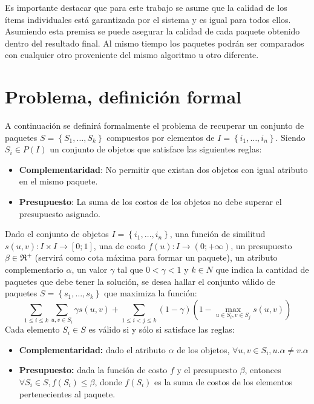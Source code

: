 Es importante destacar que para este trabajo se asume que la calidad de los ítems individuales está garantizada por el sistema y es igual para todos ellos. Asumiendo esta premisa se puede asegurar la calidad de cada paquete obtenido dentro del resultado final. Al mismo tiempo los paquetes podrán ser comparados con cualquier otro proveniente del mismo algoritmo u otro diferente.

\section{Problema, definición formal}\label{introduccion:problemaFormal}
A continuación se definirá formalmente el problema de recuperar un conjunto de paquetes $S = \left\{S_1, \ldots, S_k\right\}$ compuestos por elementos de $I=\left\{i_1,\ldots, i_n\right\}$. Siendo $S_i \in P(I)$ un conjunto de objetos que satisface las siguientes reglas:
\begin{itemize}
\item \textbf{Complementaridad}:  No permitir que existan dos objetos con igual atributo en el mismo paquete.
	\item \textbf{Presupuesto}: La suma de los costos de los objetos no debe superar el presupuesto asignado.
\end{itemize}

Dado el conjunto de objetos $I=\left\{i_1,\ldots, i_n\right\}$, una función de similitud $s(u,v): I \times I \rightarrow [0;1]$, una de costo $f(u): I \rightarrow (0;+\infty)$, un presupuesto $\beta \in \Re^{+}$ (servirá como cota máxima para formar un paquete), un atributo complementario $\alpha$, un valor $\gamma$ tal que $0 < \gamma < 1$ y $k \in N$ que indica la cantidad de paquetes que debe tener la solución, se desea hallar el conjunto válido de paquetes $S = \left\{s_1, \ldots, s_k\right\}$ que maximiza la función:
\begin{equation} \label{des:eq-fnObj}
\sum_{1 \leq i \leq k}{\sum_{u,v \in S_i}{\gamma s(u,v)}} + \sum_{1 \leq i < j \leq k}{(1-\gamma) (1-\max_{u \in S_i, v \in S_j}{s(u,v)})}
\end{equation}
Cada elemento $S_i \in S$ es válido si y sólo si satisface las reglas:
\begin{itemize}
	\item \textbf{Complementaridad:} dado el atributo $\alpha$ de los objetos, $\forall u,v \in S_i, u.\alpha \neq v.\alpha$
	\item \textbf{Presupuesto:} dada la función de costo $f$ y el presupuesto $\beta$, entonces $\forall S_i \in S, f(S_i) \leq \beta$, donde $f(S_i)$ es la suma de costos de los elementos pertenecientes al paquete.
\end{itemize}		  

